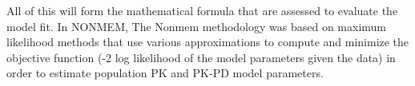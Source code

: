 \documentclass[
]{book}
\begin{document}
All of this will form the mathematical formula that are assessed to evaluate the model fit. In NONMEM, The Nonmem methodology was based on maximum likelihood methods that use various approximations to compute and minimize the objective function (-2 log likelihood of the model parameters given the data) in order to estimate population PK and PK-PD model parameters.

  
\end{document}
